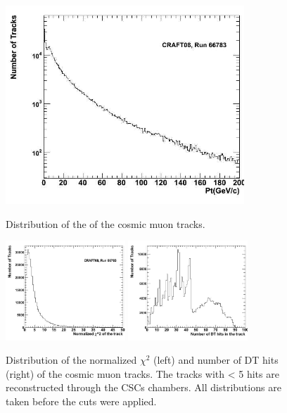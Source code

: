\begin{figure}[hbtp]

     \begin{minipage}{1.0\textwidth}
     \begin{center}
      \includegraphics[width=0.8\textwidth]{pt_sta}
       \caption{ 
Distribution of the \pt of the cosmic muon tracks. 
}
      \label{fig:pttrack}
  \end{center}
  \end{minipage}
     
 \begin{minipage}{1.0\textwidth}
  \begin{center}
 
     \includegraphics[width=0.4\textwidth]{chi2_sta}
     \includegraphics[width=0.4\textwidth]{num_hits_sta}
\caption{Distribution of the normalized $\chi^2$ (left) and number of DT hits (right) 
of the cosmic muon tracks. The tracks with < 5 hits
 are reconstructed through the CSCs chambers. 
All distributions are taken before the cuts were applied.
}
      \label{fig:nhitschi2}
  \end{center}
  \end{minipage}

\end{figure}

